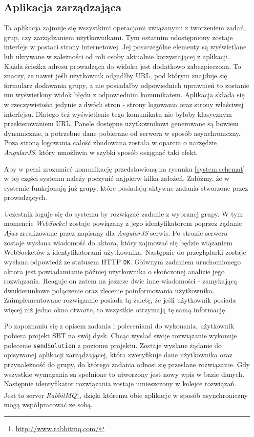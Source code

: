\documentclass[brudnopis]{xmgr}
\begin{document}
\subsection{Aplikacja zarządzająca}

Ta aplikacja zajmuje się wszystkimi operacjami związanymi z tworzeniem zadań, grup, czy zarządzaniem użytkownikami. Tym ostatnim udostępniony zostaje interfejs w postaci strony internetowej. Jej poszczególne elementy są wyświetlane lub ukrywane w zależności od roli osoby aktualnie korzystającej z aplikacji. Każda ścieżka adresu prowadząca do widoku jest dodatkowo zabezpieczona. To znaczy, że nawet jeśli użytkownik odgadłby URL, pod którym znajduje się formularz dodawania grupy, a nie posiadałby odpowiednich uprawnień to zostanie mu wyświetlony widok błędu z odpowiednim komunikatem. 
Aplikacja składa się w rzeczywistości jedynie z dwóch stron - strony logowania oraz strony właściwej interfejsu. Dlatego też wyświetlenie tego komunikatu nie byłoby klasycznym przekierowaniem URL.
Panele dostępne użytkownikowi generowane są bowiem dynamicznie, a potrzebne dane pobierane od serwera w sposób asynchroniczny. Poza stroną logowania całość zbudowana została w oparciu o narzędzie \emph{AngularJS}, który umożliwia w szybki sposób osiągnąć taki efekt.

Aby w pełni zrozumieć komunikację przedstawioną na rysunku \ref{system:schemat} w tej części systemu należy poczynić najpierw kilka założeń. Załóżmy, że w systemie funkcjonują już grupy, które posiadają aktywne zadania stworzone przez prowadzących. 

Uczestnik loguje się do systemu by rozwiązać zadanie z wybranej grupy. W tym momencie \emph{WebSocket} zostaje powiązany z jego identyfikatorem poprzez żądanie \emph{Ajax} zrealizowane przez napisany dla \emph{AngularJS} serwis. Po stronie serwera zostaje wysłana wiadomość do aktora, który zajmować się będzie wiązaniem WebSocketów z identyfikatorami użytkownika. Następnie do przeglądarki zostaje wysłana odpowiedź ze statusem HTTP \texttt{OK}. Głównym zadaniem uruchomionego aktora jest powiadamianie później użytkownika o skończonej analizie jego rozwiązania. Reaguje on zatem na jeszcze dwie inne wiadomości - zamykającą dwukierunkowe połączenie oraz zlecenie poinformowania użytkownika. Zaimplementowane rozwiązanie posiada tą zaletę, że jeśli użytkownik posiada więcej niż jedno okno otwarte, to wszystkie otrzymają tę samą informację. 

Po zapoznaniu się z opisem zadania i poleceniami do wykonania, użytkownik pobiera projekt SBT na swój dysk. Chcąc wysłać swoje rozwiązanie wykonuje polecenie \texttt{sendSolution} z poziomu projektu. Zostaje wysłane żądanie do opisywanej aplikacji zarządzającej, która zweryfikuje dane użytkownika oraz przynależność do grupy, do którego zadania odnosi się przesłane rozwiązanie. Gdy wszystkie wymagania są spełnione to utworzony jest nowy wpis w bazie danych. Następnie identyfikator rozwiązania zostaje umieszczony w kolejce rozwiązań. Jest to server \emph{RabbitMQ}\footnote{\url{http://www.rabbitmq.com/}}, dzięki któremu obie aplikacje w sposób asynchroniczny mogą współpracować ze sobą.
  
\end{document}

